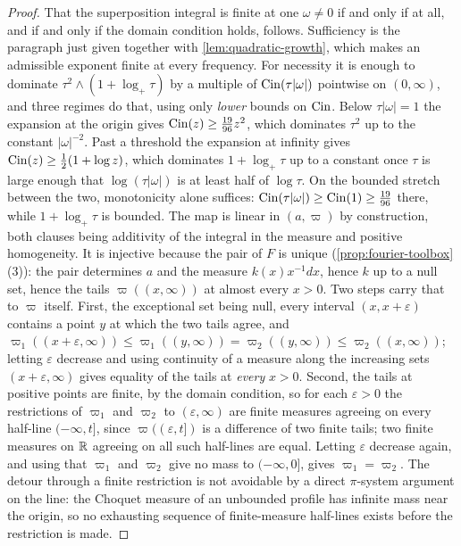 \begin{proof}
That the superposition integral is finite at one $\omega \ne 0$ if and only if at all, and if
and only if the domain condition holds, follows. Sufficiency is the paragraph just given
together with \ref{lem:quadratic-growth}, which makes an admissible exponent finite at every
frequency. For necessity it is enough to dominate $\tau^2 \wedge (1 + \log_+\tau)$ by a
multiple of $\operatorname{Cin}(\tau|\omega|)$ pointwise on $(0,\infty)$, and three regimes do that, using
only \emph{lower} bounds on $\operatorname{Cin}$. Below $\tau|\omega| = 1$ the expansion at the origin gives
$\operatorname{Cin}(z) \ge \tfrac{19}{96}z^2$, which dominates $\tau^2$ up to the constant
$|\omega|^{-2}$. Past a threshold the expansion at infinity gives
$\operatorname{Cin}(z) \ge \tfrac12(1 + \log z)$, which dominates $1 + \log_+\tau$ up to a constant once
$\tau$ is large enough that $\log(\tau|\omega|)$ is at least half of $\log\tau$. On the bounded
stretch between the two, monotonicity alone suffices:
$\operatorname{Cin}(\tau|\omega|) \ge \operatorname{Cin}(1) \ge \tfrac{19}{96}$ there, while $1 + \log_+\tau$ is bounded.
The map is linear in $(a,\varpi)$ by construction, both clauses being additivity of the
integral in the measure and positive homogeneity. It is injective because the pair of $F$ is
unique (\ref{prop:fourier-toolbox}(3)): the pair determines $a$ and the \Levy{} measure
$k(x)x^{-1}dx$, hence $k$ up to a null set, hence the tails $\varpi((x,\infty))$ at almost
every $x > 0$. Two steps carry that to $\varpi$ itself. First, the exceptional set being null,
every interval $(x, x + \varepsilon)$ contains a point $y$ at which the two tails agree, and
$\varpi_1((x + \varepsilon,\infty)) \le \varpi_1((y,\infty)) = \varpi_2((y,\infty)) \le
\varpi_2((x,\infty))$; letting $\varepsilon$ decrease and using continuity of a measure along
the increasing sets $(x + \varepsilon, \infty)$ gives equality of the tails at \emph{every}
$x > 0$. Second, the tails at positive points are finite, by the domain condition, so for each
$\varepsilon > 0$ the restrictions of $\varpi_1$ and $\varpi_2$ to $(\varepsilon,\infty)$ are
finite measures agreeing on every half-line $(-\infty,t]$, since $\varpi((\varepsilon,t])$ is a
difference of two finite tails; two finite measures on $\mathbb{R}$ agreeing on all such half-lines are
equal. Letting $\varepsilon$ decrease again, and using that $\varpi_1$ and $\varpi_2$ give no
mass to $(-\infty,0]$, gives $\varpi_1 = \varpi_2$. The detour through a finite restriction is
not avoidable by a direct $\pi$-system argument on the line: the Choquet measure of an unbounded
profile has infinite mass near the origin, so no exhausting sequence of finite-measure
half-lines exists before the restriction is made.


\end{proof}
